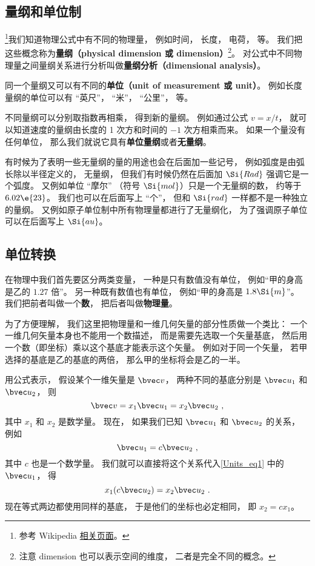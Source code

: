 
\subsection{量纲和单位制}
\footnote{参考 Wikipedia \href{https://en.wikipedia.org/wiki/Dimensional_analysis}{相关页面}。}我们知道物理公式中有不同的物理量， 例如时间， 长度， 电荷， 等。 我们把这些概念称为\textbf{量纲（physical dimension 或 dimension）}\footnote{注意 dimension 也可以表示空间的维度， 二者是完全不同的概念。}。 对公式中不同物理量之间量纲关系进行分析叫做\textbf{量纲分析（dimensional analysis）}。

同一个量纲又可以有不同的\textbf{单位（unit of measurement 或 unit）}。 例如长度量纲的单位可以有 “英尺”， “米”， “公里”， 等。

不同量纲可以分别取指数再相乘， 得到新的量纲。 例如通过公式 $v = x/t$， 就可以知道速度的量纲由长度的 1 次方和时间的 $-1$ 次方相乘而来。 如果一个量没有任何单位， 那么我们就说它具有\textbf{单位量纲}或者\textbf{无量纲}。

有时候为了表明一些无量纲的量的用途也会在后面加一些记号， 例如弧度是由弧长除以半径定义的， 无量纲， 但我们有时候仍然在后面加 $\Si{Rad}$ 强调它是一个弧度。 又例如单位 “摩尔” （符号 $\Si{mol}$）只是一个无量纲的数， 约等于 $6.02\e{23}$。 我们也可以在后面写上 “个”， 但和 $\Si{rad}$ 一样都不是一种独立的量纲。 又例如原子单位制中所有物理量都进行了无量纲化， 为了强调原子单位可以在后面写上 $\Si{au}$。

\subsection{单位转换}


在物理中我们首先要区分两类变量， 一种是只有数值没有单位， 例如“甲的身高是乙的 $1.27$ 倍”。 另一种既有数值也有单位， 例如“甲的身高是 $1.8\Si{m}$”。 我们把前者叫做一个\textbf{数}， 把后者叫做\textbf{物理量}。

为了方便理解， 我们这里把物理量和一维几何矢量的部分性质做一个类比： 一个一维几何矢量本身也不能用一个数描述， 而是需要先选取一个矢量基底， 然后用一个数（即坐标）乘以这个基底才能表示这个矢量。 例如对于同一个矢量， 若甲选择的基底是乙的基底的两倍， 那么甲的坐标将会是乙的一半。

用公式表示， 假设某个一维矢量是 $\bvec v$， 两种不同的基底分别是 $\bvec u_1$ 和 $\bvec u_2$， 则
\begin{equation}\label{Units_eq1}
\bvec v = x_1 \bvec u_1 = x_2 \bvec u_2~,
\end{equation}
其中 $x_1$ 和 $x_2$ 是数学量。 现在， 如果我们已知 $\bvec u_1$ 和 $\bvec u_2$ 的关系， 例如
\begin{equation}\label{Units_eq2}
\bvec u_1 = c \bvec u_2~,
\end{equation}
其中 $c$ 也是一个数学量。 我们就可以直接将这个关系代入\autoref{Units_eq1} 中的 $\bvec u_1$， 得
\begin{equation}
x_1 (c \bvec u_2) = x_2 \bvec u_2~.
\end{equation}
现在等式两边都使用同样的基底， 于是他们的坐标也必定相同， 即 $x_2 = c x_1$。

